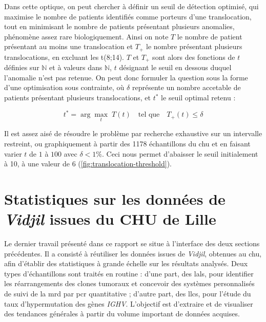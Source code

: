 \vspace{1em}

Dans cette optique, on peut chercher à définir un seuil de détection optimisé, qui maximise le nombre de patients identifiés comme porteurs d'une translocation, 
tout en minimisant le nombre de patients présentant plusieurs anomalies, phénomène assez rare biologiquement. Ainsi on note $T$ le nombre de patient 
présentant au moins une translocation et $T_{+}$ le nombre présentant plusieurs translocations, en excluant les t(8;14). $T$ et $T_{+}$ sont alors des fonctions 
de $t$ définies sur $\mathbb{N}$ et à valeurs dans $\mathbb{N}$, $t$ désignant le seuil en dessous duquel l'anomalie n'est pas retenue. On peut donc formuler la question sous la forme d'une optimisation sous contrainte, 
où $\delta$ représente un nombre accetable de patients présentant plusieurs translocations, et $t^*$ le seuil optimal retenu :

\begin{equation}
    t^* = \arg\max_{t} \; T(t) \quad \text{tel que} \quad T_{+}(t) \leq \delta
 \end{equation}
    
 Il est assez aisé de résoudre le problème par recherche exhaustive sur un intervalle restreint, ou graphiquement à partir des 1178 échantillons du \gls{chu} et en faisant varier 
 $t$ de $1$ à $100$ avec $\delta < 1 \%$. Ceci nous permet d'abaisser le seuil initialement à 10, à une valeur de 6 (\autoref{fig:translocation-threshold}).



\section{Statistiques sur les données de \textit{Vidjil} issues du CHU de Lille}

Le dernier travail présenté dans ce rapport se situe à l'interface des deux sections précédentes. Il a consisté à réutiliser les données issues de \textit{Vidjil}, obtenues au \gls{chu}, 
afin d'établir des statistiques à grande échelle sur les résultats analysés. Deux types d'échantillons sont traités en routine : d'une part, des \glspl{lal}, pour identifier les 
réarrangements des clones tumoraux et concevoir des systèmes personnalisés de suivi de la \gls{mrd} par \gls{pcr} quantitative ; d'autre part, des \glspl{llc}, pour l'étude du taux 
d'hypermutation des gènes \textit{IGHV}. L'objectif est d'extraire et de visualiser des tendances générales à partir du volume important de données acquises.

